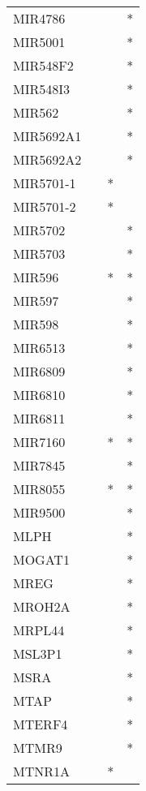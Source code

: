 \begin{longtable}{lccc}
MIR4786        &       &    &       * \\
MIR5001        &       &    &       * \\
MIR548F2       &       &    &       * \\
MIR548I3       &       &    &       * \\
MIR562         &       &    &       * \\
MIR5692A1      &       &    &       * \\
MIR5692A2      &       &    &       * \\
MIR5701-1      &       &  * &         \\
MIR5701-2      &       &  * &         \\
MIR5702        &       &    &       * \\
MIR5703        &       &    &       * \\
MIR596         &       &  * &       * \\
MIR597         &       &    &       * \\
MIR598         &       &    &       * \\
MIR6513        &       &    &       * \\
MIR6809        &       &    &       * \\
MIR6810        &       &    &       * \\
MIR6811        &       &    &       * \\
MIR7160        &       &  * &       * \\
MIR7845        &       &    &       * \\
MIR8055        &       &  * &       * \\
MIR9500        &       &    &       * \\
MLPH           &       &    &       * \\
MOGAT1         &       &    &       * \\
MREG           &       &    &       * \\
MROH2A         &       &    &       * \\
MRPL44         &       &    &       * \\
MSL3P1         &       &    &       * \\
MSRA           &       &    &       * \\
MTAP           &       &    &       * \\
MTERF4         &       &    &       * \\
MTMR9          &       &    &       * \\
MTNR1A         &       &  * &         \\

\end{longtable}
